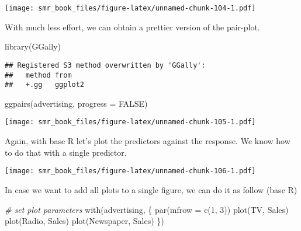 \documentclass[
  oneside]{book}
\newenvironment{Shaded}{\begin{snugshade}}{\end{snugshade}}
\newcommand{\AttributeTok}[1]{\textcolor[rgb]{0.77,0.63,0.00}{#1}}
\newcommand{\CommentTok}[1]{\textcolor[rgb]{0.56,0.35,0.01}{\textit{#1}}}
\newcommand{\ConstantTok}[1]{\textcolor[rgb]{0.00,0.00,0.00}{#1}}
\newcommand{\DecValTok}[1]{\textcolor[rgb]{0.00,0.00,0.81}{#1}}
\newcommand{\FunctionTok}[1]{\textcolor[rgb]{0.00,0.00,0.00}{#1}}
\newcommand{\NormalTok}[1]{#1}
\newcommand{\SpecialCharTok}[1]{\textcolor[rgb]{0.00,0.00,0.00}{#1}}
\begin{document}
\texttt{[image: smr\_book\_files/figure-latex/unnamed-chunk-104-1.pdf]}

With much less effort, we can obtain a prettier
version of the pair-plot.

\begin{Shaded}
\begin{Highlighting}[]
\FunctionTok{library}\NormalTok{(GGally)}
\end{Highlighting}
\end{Shaded}

\begin{verbatim}
## Registered S3 method overwritten by 'GGally':
##   method from   
##   +.gg   ggplot2
\end{verbatim}

\begin{Shaded}
\begin{Highlighting}[]
\FunctionTok{ggpairs}\NormalTok{(advertising, }\AttributeTok{progress =} \ConstantTok{FALSE}\NormalTok{)}
\end{Highlighting}
\end{Shaded}

\texttt{[image: smr\_book\_files/figure-latex/unnamed-chunk-105-1.pdf]}

Again, with base R let's plot the predictors against the response.
We know how to do that with a single predictor.

\begin{Shaded}
\end{Shaded}

\texttt{[image: smr\_book\_files/figure-latex/unnamed-chunk-106-1.pdf]}

In case we want to add all plots to a single figure,
we can do it as follow (base R)

\begin{Shaded}
\begin{Highlighting}[]
\CommentTok{\# set plot parameters}
\FunctionTok{with}\NormalTok{(advertising, \{}
  \FunctionTok{par}\NormalTok{(}\AttributeTok{mfrow =} \FunctionTok{c}\NormalTok{(}\DecValTok{1}\NormalTok{, }\DecValTok{3}\NormalTok{))}
  \FunctionTok{plot}\NormalTok{(TV, Sales)}
  \FunctionTok{plot}\NormalTok{(Radio, Sales)}
  \FunctionTok{plot}\NormalTok{(Newspaper, Sales)}
\NormalTok{\})}
\end{Highlighting}
\end{Shaded}
\end{document}
